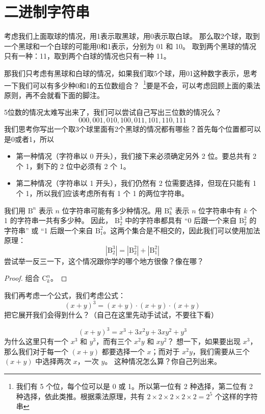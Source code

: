 \documentclass[lang=cn,math=mtpro2,11pt,scheme=chinese,pad]{elegantbook}
\begin{document}
\section{二进制字符串}

考虑我们上面取球的情况，用1表示取黑球，用0表示取白球。
那么取2个球，取到一个黑球和一个白球的可能用0和1表示，分别为 01 和 10。
取到两个黑球的情况只有一种：11，取到两个白球的情况也只有一种 11。

那我们只考虑有黑球和白球的情况，如果我们取5个球，用01这种数字表示，思考一下我们可以有多少种0和1的五位数组合？~\footnote{我们有 5 个位，每个位可以是 0 或 1。所以第一位有 2 种选择，第二位有 2 种选择，依此类推。根据乘法原理，共有 \(2 \times 2 \times 2 \times 2 \times 2 = 2^5\) 个这样的字符串}要是不会，可以考虑回顾上面的乘法原则，再不会就看下面的脚注。

5位数的情况太难写出来了，我们可以尝试自己写出三位数的情况么？
\[
000, 001, 010, 100, 011, 101, 110, 111
\]
我们思考你写出一个取3个球里面有2个黑球的情况都有哪些？首先每个位置都可以是0或者1，所以
\begin{itemize}
  \item 第一种情况（字符串以 0 开头），我们接下来必须确定另外 2 位。要总共有 2 个 1，剩下的 2 位中必须有 2 个 1。
  \item 第二种情况（字符串以 1 开头），我们仍然有 2 位需要选择，但现在只能有 1 个 1，所以我们应该考虑所有有 1 个 1 的两位字符串。
\end{itemize}
我们用 \(\text{B}^{n}\) 表示 \(n\) 位字符串可能有多少种情况。用 \(\text{B}^{n}_{k}\) 表示 \(n\) 位字符串中有 \(k\) 个 1 的字符串一共有多少种。
因此， \(\text{B}^{3}_{2}\) 中的字符串都具有 “0 后跟一个来自 \(\text{B}^{2}_{2}\) 的字符串” 或 “1 后跟一个来自 \(\text{B}^{2}_{1}\)。这两个集合是不相交的，因此我们可以使用加法原理：
\[
|\text{B}^{3}_{2}| = |\text{B}^{2}_{2}| + |\text{B}^{2}_{1}|
\]
尝试举一反三一下，这个情况跟你学的哪个地方很像？像在哪？
\begin{proof}
  组合 \(\text{C}_{k}^{n}\)。
\end{proof}

我们再考虑一个公式，我们考虑公式：
\[
\left( x + y \right)^{3} = \left( x + y \right) \cdot \left( x + y \right) \cdot \left( x + y \right)
\]
把它展开我们会得到什么？（自己在这里先动手试试，不要往下看）

\[
\left( x + y \right)^{3} = x^3 + 3 x^2 y +3 x y^2 + y^3
\]
为什么这里只有一个 \(x^3\) 和 \(y^3\)，而有三个 \(x^2 y\) 和 \(x y^2\)？
想一下，如果要出现 \(x^3\)，那么我们对于每一个 \(\left( x + y \right)\) 都要选择一个 \(x\)；而对于 \(x^2 y\)，我们需要从三个 \(\left( x + y \right)\) 中选择两次 \(x\)，一次 \(y\)。
这种情况怎么算？你自己列出来。
\end{document}
